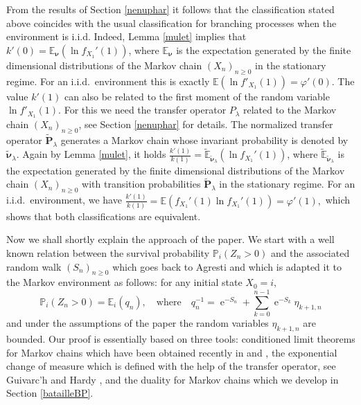 \documentclass[12pt]{amsart}
\theoremstyle{definition}
\numberwithin{equation}{section}
\def\bs#1{\boldsymbol{#1}}
\def\tbf#1{\tilde{\mathbf{#1}}}
\def\tbs#1{\tilde{\boldsymbol{#1}}}
\def\tbb#1{\tilde{\mathbb{#1}}}
\def\geq{\geqslant}
\def\phi{\varphi}
\renewcommand\ll{\lambda}
\DeclareMathOperator{\e}{e}
\begin{document}
From the results of  Section \ref{nenuphar} it follows that the classification stated above coincides with the usual classification for branching processes when the environment is i.i.d. 
Indeed, Lemma \ref{mulet} implies that
$k'(0) = \mathbb E_{\bs \nu} \left(  \ln f_{X_1}'(1) \right)$,
where $\mathbb E_{\bs \nu} $ is the expectation generated by the finite dimensional distributions 
of the Markov chain $\left( X_n \right)_{n\geq 0}$ in the stationary regime.
For an i.i.d.\ environment this is exactly $\mathbb E(\ln f'_{X_1}(1))=\phi'(0).$
The value $k'(1)$ can also be related to  the first moment of the random variable $\ln f'_{X_1}(1)$. 
For this we need the  transfer operator $P_{\ll}$ related to the Markov chain $\left( X_n \right)_{n\geq 0}$,
see Section \ref{nenuphar} for details.
The normalized transfer operator $\tbf P_{\ll}$ generates a Markov chain whose invariant probability is denoted by 
$\tbs \nu_{\ll}.$ 
Again by Lemma \ref{mulet}, it holds
$\frac{k'(1)}{k(1)}  = \tbb E_{\tbs \nu_{\ll}} \left( \ln  f_{X_1}'(1) \right)$, where $\tbb E_{\tbs \nu_{\ll}} $ is the expectation generated by the finite dimensional distributions of the Markov chain $( X_n )_{n\geq 0}$ with transition probabilities $\tbf P_{\ll}$
in the stationary regime. For an i.i.d.\ environment, we have $\frac{k'(1)}{k(1)} =\mathbb E \left(  f_{X_1}'(1) \ln  f_{X_1}'(1)  \right)=\phi'(1),$ which shows that both classifications are equivalent.

Now we shall shortly explain the approach of the paper. 
We start with a well known relation between the survival probability $\mathbb P_i(Z_n>0)$ 
and the associated random walk 
$\left( S_n \right)_{n\geq 0}$
which goes back to Agresti \cite{agresti_bounds_1974} and which is adapted it to the Markov environment as follows: for any initial state $X_0=i,$ 
\begin{equation}
\label{Agre001}
	\mathbb P_i(Z_n>0) = \mathbb E_i (q_n), \quad \mbox{where} \quad q_n^{-1}= \e^{-S_n} + \sum_{k=0}^{n-1} \e^{-S_k} \eta_{k+1,n}
\end{equation}
and under the assumptions of the paper the random variables $\eta_{k+1,n}$ are bounded.
Our proof is essentially based on three tools: 
conditioned limit theorems for Markov chains which have been obtained recently
in \cite{grama_limit_2016-1} and  \cite{GLLP_CLLT_2017},  
the exponential change of measure which is defined with the help of the transfer operator,
see Guivarc'h and Hardy \cite{guivarch_theoremes_1988}, 
and the duality for Markov chains which we develop in Section \ref{batailleBP}.
\end{document}
